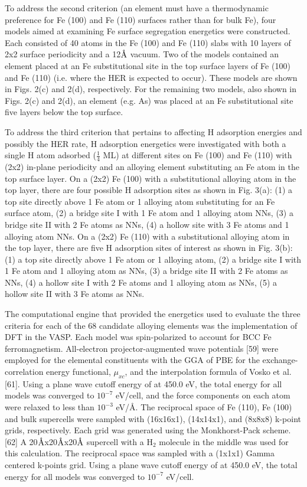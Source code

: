 To address the second criterion (an element must have a thermodynamic preference for Fe (100) and Fe (110) surfaces rather than for bulk Fe), four models aimed at examining Fe surface segregation energetics were constructed. Each consisted of 40 atoms in the Fe (100) and Fe (110) slabs with 10 layers of 2x2 surface periodicity and a 12$\mbox{\normalfont\AA}$ vacuum.  Two of the models contained an element placed at an Fe substitutional site in the top surface layers of Fe (100) and Fe (110) (i.e. where the \ac{HER} is expected to occur). These models are shown in Figs. 2(c) and 2(d), respectively. For the remaining two models, also shown in Figs. 2(c) and 2(d), an element (e.g. As) was placed at an Fe substitutional site five layers below the top surface.

To address the third criterion that pertains to affecting H adsorption energies and possibly the HER rate, H adsorption energetics were investigated with both a single H atom adsorbed ($\frac{1}{4}$ \ac{ML}) at different sites on Fe (100) and Fe (110) with (2x2) in-plane periodicity and an alloying element substituting an Fe atom in the top surface layer. On a (2x2) Fe (100) with a substitutional alloying atom in the top layer, there are four possible H adsorption sites as shown in Fig. 3(a): (1) a top site directly above 1 Fe atom or 1 alloying atom substituting for an Fe surface atom, (2) a bridge site I with 1 Fe atom and 1 alloying atom  \ac{NNs}, (3) a bridge site II with 2 Fe atoms as \ac{NNs}, (4) a hollow site with 3 Fe atoms and 1 alloying atom \ac{NNs}. On a (2x2) Fe (110) with a substitutional alloying atom in the top layer, there are five H adsorption sites of interest as shown in Fig. 3(b): (1) a top site directly above 1 Fe atom or 1 alloying atom, (2) a bridge site I with 1 Fe atom and 1 alloying atom as \ac{NNs}, (3) a bridge site II with 2 Fe atoms as \ac{NNs}, (4) a hollow site I with 2 Fe atoms and 1 alloying atom as \ac{NNs}, (5) a hollow site II with 3 Fe atoms as \ac{NNs}.

The computational engine that provided the energetics used to evaluate the three criteria for each of the 68 candidate alloying elements was the implementation of \ac{DFT} in the \ac{VASP}. Each model was spin-polarized to account for \ac{BCC} Fe ferromagnetism. All-electron projector-augmented wave potentials [59] were employed for the elemental constituents with the \ac{GGA} of \ac{PBE} for the exchange-correlation energy functional, $\mu_{xc}$, and the interpolation formula of Vosko et al. [61]. Using a plane wave cutoff energy of at 450.0 eV, the total energy for all models was converged to $10^{−7}$ eV/cell, and the force components on each atom were relaxed to less than $10^{−3}$ eV/Å. The reciprocal space of Fe (110), Fe (100) and bulk supercells were sampled with (16x16x1), (14x14x1), and (8x8x8) k-point grids, respectively. Each grid was generated using the Monkhorst-Pack scheme.[62] A 20$\mbox{\normalfont\AA}$x20$\mbox{\normalfont\AA}$x20$\mbox{\normalfont\AA}$ supercell with a $\text{H}_2$ molecule in the middle was used for this calculation. The reciprocal space was sampled with a (1x1x1) Gamma centered k-points grid. Using a plane wave cutoff energy of at 450.0 eV, the total energy for all models was converged to $10^{−7}$ eV/cell.

